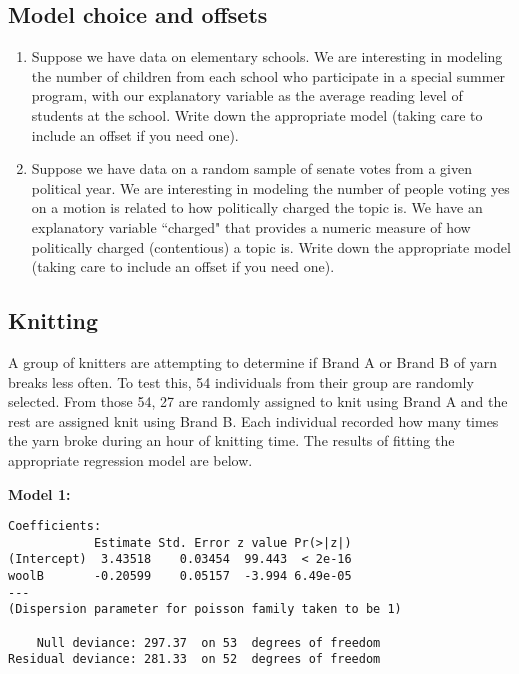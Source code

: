 \documentclass[11pt]{article}
\begin{document}
\subsection{Model choice and offsets}

\begin{enumerate}
\item Suppose we have data on elementary schools. We are interesting in modeling the number of children from each school who participate in a special summer program, with our explanatory variable as the average reading level of students at the school. Write down the appropriate model (taking care to include an offset if you need one). 


\vspace{3cm} 
 

\item Suppose we have data on a random sample of senate votes from a given political year. We are interesting in modeling the number of people voting yes on a motion is related to how politically charged the topic is. We have an explanatory variable ``charged" that provides a numeric measure of how politically charged (contentious) a topic is. Write down the appropriate model (taking care to include an offset if you need one).

\end{enumerate}

\newpage


\subsection{Knitting}

A group of knitters are attempting to determine if Brand A or Brand B of yarn breaks less often. To test this, 54 individuals from their group are randomly selected. From those 54, 27 are randomly assigned to knit using Brand A and the rest are assigned knit using Brand B. Each individual recorded how many times the yarn broke during an hour of knitting time. The results of fitting the appropriate regression model are below.  

\textbf{Model 1:} 
{
\begin{verbatim}
Coefficients:
            Estimate Std. Error z value Pr(>|z|)    
(Intercept)  3.43518    0.03454  99.443  < 2e-16 
woolB       -0.20599    0.05157  -3.994 6.49e-05 
---
(Dispersion parameter for poisson family taken to be 1)

    Null deviance: 297.37  on 53  degrees of freedom
Residual deviance: 281.33  on 52  degrees of freedom
\end{verbatim}
}
\end{document}
